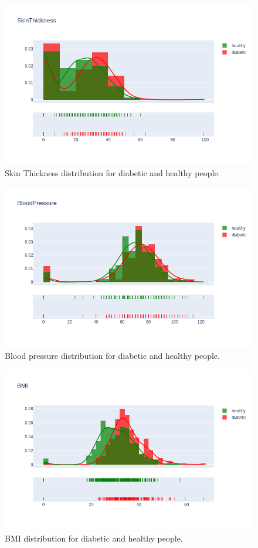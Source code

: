 \documentclass[12pt]{article}
\begin{document}
\begin{figure}[ht]
\centering
\includegraphics[width=1\textwidth]{newplot(6).png}
\caption{Skin Thickness distribution for diabetic and healthy people.}
\end{figure}

\begin{figure}[ht]
\centering
\includegraphics[width=1\textwidth]{newplot(7).png}
\caption{Blood pressure distribution for diabetic and healthy people.}
\end{figure}

\begin{figure}[ht]
\centering
\includegraphics[width=1\textwidth]{newplot(8).png}
\caption{BMI distribution for diabetic and healthy people.}
\end{figure}
\end{document}
